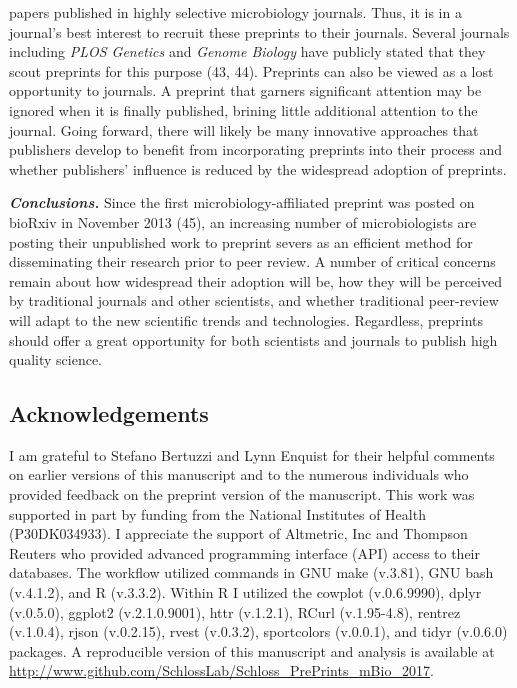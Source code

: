 \documentclass[11pt,]{article}
\begin{document}
papers published in highly selective microbiology journals. Thus, it is
in a journal's best interest to recruit these preprints to their
journals. Several journals including \emph{PLOS Genetics} and
\emph{Genome Biology} have publicly stated that they scout preprints for
this purpose (43, 44). Preprints can also be viewed as a lost
opportunity to journals. A preprint that garners significant attention
may be ignored when it is finally published, brining little additional
attention to the journal. Going forward, there will likely be many
innovative approaches that publishers develop to benefit from
incorporating preprints into their process and whether publishers'
influence is reduced by the widespread adoption of preprints.

\textbf{\emph{Conclusions.}} Since the first microbiology-affiliated
preprint was posted on bioRxiv in November 2013 (45), an increasing
number of microbiologists are posting their unpublished work to preprint
severs as an efficient method for disseminating their research prior to
peer review. A number of critical concerns remain about how widespread
their adoption will be, how they will be perceived by traditional
journals and other scientists, and whether traditional peer-review will
adapt to the new scientific trends and technologies. Regardless,
preprints should offer a great opportunity for both scientists and
journals to publish high quality science.

\subsection{Acknowledgements}\label{acknowledgements}

I am grateful to Stefano Bertuzzi and Lynn Enquist for their helpful
comments on earlier versions of this manuscript and to the numerous
individuals who provided feedback on the preprint version of the
manuscript. This work was supported in part by funding from the National
Institutes of Health (P30DK034933). I appreciate the support of
Altmetric, Inc and Thompson Reuters who provided advanced programming
interface (API) access to their databases. The workflow utilized
commands in GNU make (v.3.81), GNU bash (v.4.1.2), and R (v.3.3.2).
Within R I utilized the cowplot (v.0.6.9990), dplyr (v.0.5.0), ggplot2
(v.2.1.0.9001), httr (v.1.2.1), RCurl (v.1.95-4.8), rentrez (v.1.0.4),
rjson (v.0.2.15), rvest (v.0.3.2), sportcolors (v.0.0.1), and tidyr
(v.0.6.0) packages. A reproducible version of this manuscript and
analysis is available at
\url{http://www.github.com/SchlossLab/Schloss_PrePrints_mBio_2017}.
\end{document}

